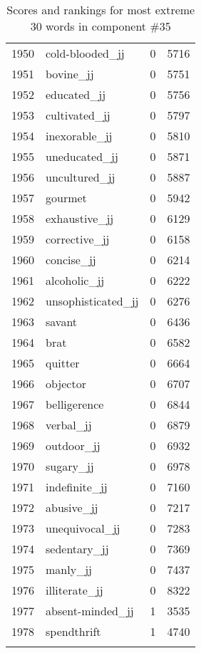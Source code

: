 \begin{longtable}[!htbp]{| rlr@{.}l |}
    1950 & cold-blooded\_jj & 0 & 5716 \\
    1951 & bovine\_jj & 0 & 5751 \\
    1952 & educated\_jj & 0 & 5756 \\
    1953 & cultivated\_jj & 0 & 5797 \\
    1954 & inexorable\_jj & 0 & 5810 \\
    1955 & uneducated\_jj & 0 & 5871 \\
    1956 & uncultured\_jj & 0 & 5887 \\
    1957 & gourmet & 0 & 5942 \\
    1958 & exhaustive\_jj & 0 & 6129 \\
    1959 & corrective\_jj & 0 & 6158 \\
    1960 & concise\_jj & 0 & 6214 \\
    1961 & alcoholic\_jj & 0 & 6222 \\
    1962 & unsophisticated\_jj & 0 & 6276 \\
    1963 & savant & 0 & 6436 \\
    1964 & brat & 0 & 6582 \\
    1965 & quitter & 0 & 6664 \\
    1966 & objector & 0 & 6707 \\
    1967 & belligerence & 0 & 6844 \\
    1968 & verbal\_jj & 0 & 6879 \\
    1969 & outdoor\_jj & 0 & 6932 \\
    1970 & sugary\_jj & 0 & 6978 \\
    1971 & indefinite\_jj & 0 & 7160 \\
    1972 & abusive\_jj & 0 & 7217 \\
    1973 & unequivocal\_jj & 0 & 7283 \\
    1974 & sedentary\_jj & 0 & 7369 \\
    1975 & manly\_jj & 0 & 7437 \\
    1976 & illiterate\_jj & 0 & 8322 \\
    1977 & absent-minded\_jj & 1 & 3535 \\
    1978 & spendthrift & 1 & 4740 \\
    \hline
    \caption{Scores and rankings for most extreme 30 words in component \#35} \\
\end{longtable}
